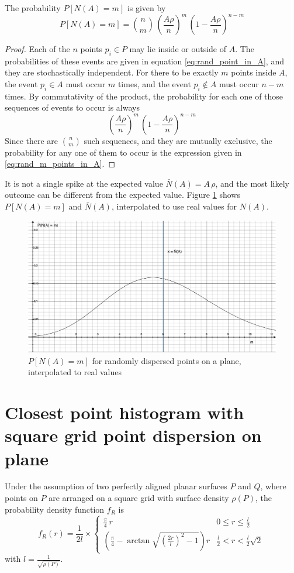 The probability $P[N(A) = m]$ is given by
\begin{equation} \label{eq:rand_m_points_in_A}
P[N(A) = m] = \binom{n}{m} \, \left( \frac{A \rho}{n} \right)^m \, \left( 1 - \frac{A \rho}{n} \right)^{n-m}
\end{equation}

\begin{proof}
Each of the $n$ points $p_i \in P$ may lie inside or outside of $A$. The probabilities of these events are given in equation \ref{eq:rand_point_in_A}, and they are stochastically independent. For there to be exactly $m$ points inside $A$, the event $p_i \in A$ must occur $m$ times, and the event $p_i \notin A$ must occur $n - m$ times.
By commutativity of the product, the probability for each one of those sequences of events to occur is always
\begin{equation}
\left( \frac{A \rho}{n} \right)^m \, \left( 1 - \frac{A \rho}{n} \right)^{n-m}
\end{equation}
Since there are $\binom{n}{m}$ such sequences, and they are mutually exclusive, the probability for any one of them to occur is the expression given in \ref{eq:rand_m_points_in_A}.
\end{proof}

It is not a single spike at the expected value $\bar{N}(A) = A \, \rho$, and the most likely outcome can be different from the expected value. Figure \ref{fig:plane_rand_n} shows $P[N(A) = m]$ and $\bar{N}(A)$, interpolated to use real values for $N(A)$.

\begin{figure}[h]
\centering
\includegraphics[width=.5\textwidth]{fig/plane_rand_n.pdf}
\caption{$P[N(A) = m]$ for randomly dispersed points on a plane, interpolated to real values}
\label{fig:plane_rand_n}
\end{figure}


\section{Closest point histogram with square grid point dispersion on plane} \label{sec:proof_sqgrid_disp_plane}
Under the assumption of two perfectly aligned planar surfaces $P$ and $Q$, where points on $P$ are arranged on a square grid with surface density $\rho(P)$, the probability density function $f_R$ is
\begin{equation}
f_R(r) = \frac{1}{2 l} \times \begin{cases}
	\frac{\pi}{4} \, r & 0 \leq r \leq \frac{l}{2} \\
	\left( \frac{\pi}{4} - \arctan{\sqrt{\left( \frac{2r}{l} \right)^2 - 1}} \right) r & \frac{l}{2} < r < \frac{l}{2} \sqrt{2}
\end{cases}
\end{equation}
with $l = \frac{1}{\sqrt{\rho(P)}}$.

